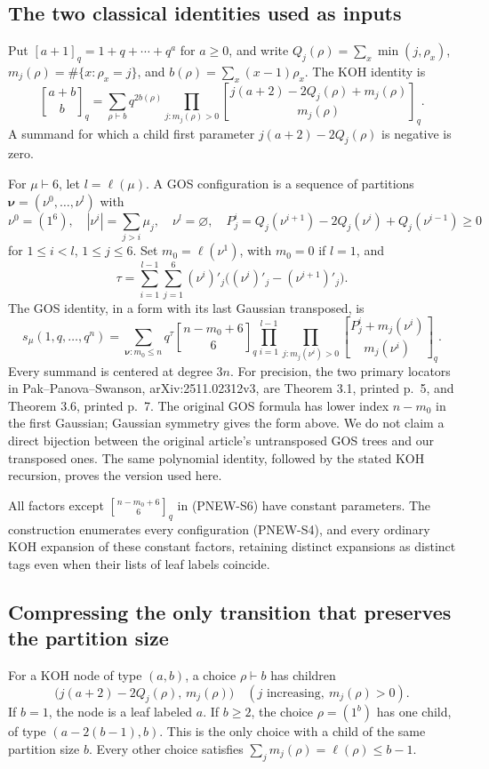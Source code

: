 \subsection{The two classical identities used as inputs}
Put $[a+1]_q=1+q+\cdots+q^a$ for $a\ge0$, and write
$Q_j(\rho)=\sum_x\min(j,\rho_x)$,
$m_j(\rho)=\#\{x:\rho_x=j\}$, and
$b(\rho)=\sum_x(x-1)\rho_x$.  The KOH identity is
\[
 {a+b\brack b}_q
 =\sum_{\rho\vdash b}q^{2b(\rho)}
   \prod_{j:m_j(\rho)>0}
   {j(a+2)-2Q_j(\rho)+m_j(\rho)\brack m_j(\rho)}_q.
 \tag{PNEW-S3}
\]
A summand for which a child first parameter
$j(a+2)-2Q_j(\rho)$ is negative is zero.

For $\mu\vdash6$, let $l=\ell(\mu)$.  A GOS configuration is
a sequence of partitions $\boldsymbol\nu=(\nu^0,\ldots,\nu^l)$
with
\[
 \nu^0=(1^6),\quad |\nu^i|=\sum_{j>i}\mu_j,
 \quad\nu^l=\varnothing,
 \quad P_j^i=Q_j(\nu^{i+1})-2Q_j(\nu^i)+Q_j(\nu^{i-1})\ge0
 \tag{PNEW-S4}
\]
for $1\le i<l$, $1\le j\le6$.
Set $m_0=\ell(\nu^1)$, with $m_0=0$ if $l=1$, and
\[
 \tau=\sum_{i=1}^{l-1}\sum_{j=1}^{6}
      (\nu^i)'_j\bigl((\nu^i)'_j-(\nu^{i+1})'_j\bigr).
 \tag{PNEW-S5}
\]
The GOS identity, in a form with its last Gaussian transposed, is
\[
 s_\mu(1,q,\ldots,q^n)
 =\sum_{\boldsymbol\nu:m_0\le n}
    q^\tau {n-m_0+6\brack6}_q
    \prod_{i=1}^{l-1}\prod_{j:m_j(\nu^i)>0}
                  {P_j^i+m_j(\nu^i)\brack m_j(\nu^i)}_q.
 \tag{PNEW-S6}
\]
Every summand is centered at degree $3n$.
For precision, the two primary locators in Pak--Panova--Swanson,
arXiv:2511.02312v3, are Theorem 3.1, printed p.~5, and
Theorem 3.6, printed p.~7.  The original GOS formula has lower
index $n-m_0$ in the first Gaussian; Gaussian symmetry gives
the form above.  We do not claim a direct bijection between the
original article's untransposed GOS trees and our transposed
ones.  The same polynomial identity, followed by the stated
KOH recursion, proves the version used here.

All factors except ${n-m_0+6\brack6}_q$ in (PNEW-S6) have
constant parameters.  The construction enumerates every
configuration (PNEW-S4), and every ordinary KOH expansion of
these constant factors, retaining distinct expansions as
distinct tags even when their lists of leaf labels coincide.

\subsection{Compressing the only transition that preserves the partition size}
For a KOH node of type $(a,b)$, a choice $\rho\vdash b$ has
children
\[
 \bigl(j(a+2)-2Q_j(\rho),\,m_j(\rho)\bigr)
       \quad(j\text{ increasing},\ m_j(\rho)>0).
 \tag{PNEW-S7}
\]
If $b=1$, the node is a leaf labeled $a$.
If $b\ge2$, the choice $\rho=(1^b)$ has one child,
of type $(a-2(b-1),b)$.  This is the only choice with a
child of the same partition size $b$.
Every other choice satisfies
$\sum_jm_j(\rho)=\ell(\rho)\le b-1$.

